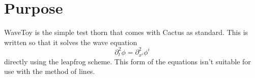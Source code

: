 









\section{Purpose}
\label{sec:purpose}

WaveToy is the simple test thorn that comes with Cactus as
standard. This is written so that it solves the wave equation
\begin{equation}
  \label{eq:wave1}
  \partial_t^2 \phi = \partial_{x^i}^2 \phi^i
\end{equation}
directly using the leapfrog scheme. This form of the equations isn't
suitable for use with the method of lines.


